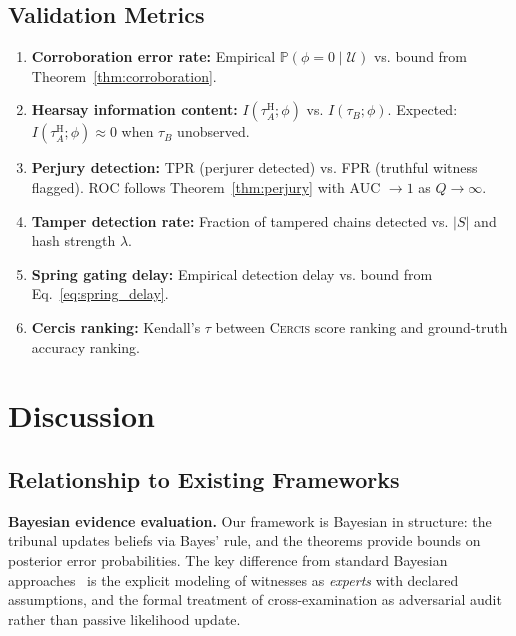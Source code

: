 \documentclass[11pt,a4paper]{article}
\theoremstyle{definition}
\newcommand{\Cercis}{\textsc{Cercis}}
\newcommand{\Pbb}{\mathbb{P}}
\newcommand{\abs}[1]{\left|#1\right|}
\newcommand{\fact}{\phi}                        %
\newcommand{\hear}{\mathrm{H}}                  %
\begin{document}
\subsection{Validation Metrics}

\begin{enumerate}[label=\textbf{M\arabic*}.]
    \item \textbf{Corroboration error rate:} Empirical $\Pbb(\fact = 0 \mid \mathcal{U})$ vs. bound from Theorem~\ref{thm:corroboration}.
    \item \textbf{Hearsay information content:} $I(\tau_A^{\hear}; \fact)$ vs. $I(\tau_B; \fact)$. Expected: $I(\tau_A^{\hear}; \fact) \approx 0$ when $\tau_B$ unobserved.
    \item \textbf{Perjury detection:} TPR (perjurer detected) vs. FPR (truthful witness flagged). ROC follows Theorem~\ref{thm:perjury} with AUC $\to 1$ as $Q \to \infty$.
    \item \textbf{Tamper detection rate:} Fraction of tampered chains detected vs. $\abs{S}$ and hash strength $\lambda$.
    \item \textbf{Spring gating delay:} Empirical detection delay vs. bound from Eq.~\eqref{eq:spring_delay}.
    \item \textbf{Cercis ranking:} Kendall's $\tau$ between \Cercis{} score ranking and ground-truth accuracy ranking.
\end{enumerate}

\section{Discussion }
\label{sec:discussion}

\subsection{Relationship to Existing Frameworks}

\textbf{Bayesian evidence evaluation.} Our framework is Bayesian in structure: the tribunal updates beliefs via Bayes' rule, and the theorems provide bounds on posterior error probabilities. The key difference from standard Bayesian approaches~\cite{Taroni2014, Fenton2013} is the explicit modeling of witnesses as \textit{experts} with declared assumptions, and the formal treatment of cross-examination as adversarial audit rather than passive likelihood update.
\end{document}
